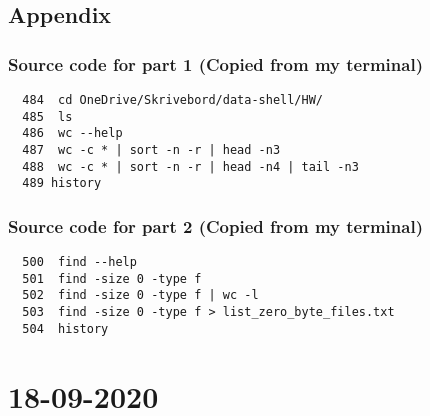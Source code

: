 \documentclass{article}
\begin{document}
\subsection{Appendix}
\subsubsection {Source code for part 1 (Copied from my terminal)}
\begin{verbatim}
  484  cd OneDrive/Skrivebord/data-shell/HW/
  485  ls
  486  wc --help
  487  wc -c * | sort -n -r | head -n3
  488  wc -c * | sort -n -r | head -n4 | tail -n3
  489 history
\end{verbatim}

\subsubsection{Source code for part 2 (Copied from my terminal)}
  \begin{verbatim}
  500  find --help
  501  find -size 0 -type f
  502  find -size 0 -type f | wc -l
  503  find -size 0 -type f > list_zero_byte_files.txt
  504  history

  \end{verbatim}

\section{18-09-2020}
\end{document}
